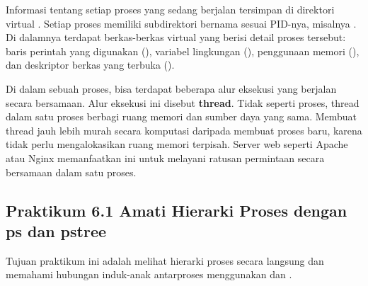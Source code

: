 Informasi tentang setiap proses yang sedang berjalan tersimpan di direktori virtual
. Setiap proses memiliki subdirektori bernama sesuai PID-nya, misalnya
. Di dalamnya terdapat berkas-berkas virtual yang berisi detail proses
tersebut: baris perintah yang digunakan (), variabel lingkungan
(), penggunaan memori (), dan deskriptor berkas yang terbuka
().

Di dalam sebuah proses, bisa terdapat beberapa alur eksekusi yang berjalan secara
bersamaan. Alur eksekusi ini disebut \textbf{thread}. Tidak seperti proses, thread dalam
satu proses berbagi ruang memori dan sumber daya yang sama. Membuat thread jauh lebih
murah secara komputasi daripada membuat proses baru, karena tidak perlu mengalokasikan
ruang memori terpisah. Server web seperti Apache atau Nginx memanfaatkan ini untuk
melayani ratusan permintaan secara bersamaan dalam satu proses.

\subsection*{Praktikum 6.1 Amati Hierarki Proses dengan ps dan pstree}

Tujuan praktikum ini adalah melihat hierarki proses secara langsung dan memahami hubungan
induk-anak antarproses menggunakan  dan .

